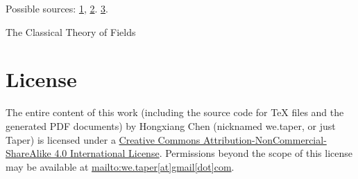 \documentclass{article}
\numberwithin{equation}{subsection} %
\theoremstyle{definition}
\begin{document}
    Possible sources: \href{http://physics.stackexchange.com/questions/16018/does-a-photon-in-vacuum-have-a-rest-frame}{1},
    \href{http://physics.stackexchange.com/questions/29082/would-time-freeze-if-you-could-travel-at-the-speed-of-light}{2}.
    \href{https://www.quora.com/What-does-the-frame-of-reference-of-a-photon-look-like}{3}.
\begin{thebibliography}{1}
     The Classical Theory of Fields
\end{thebibliography}
\printnomenclature
\section{License}
The entire content of this work (including the source code
for TeX files and the generated PDF documents) by 
Hongxiang Chen (nicknamed we.taper, or just Taper) is
licensed under a 
\href{http://creativecommons.org/licenses/by-nc-sa/4.0/}{Creative 
Commons Attribution-NonCommercial-ShareAlike 4.0 International 
License}. Permissions beyond the scope of this 
license may be available at \url{mailto:we.taper[at]gmail[dot]com}.
\end{document}
